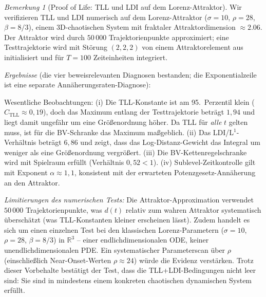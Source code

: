 \documentclass[12pt,a4paper]{article}
\theoremstyle{definition}
\theoremstyle{plain}
\theoremstyle{remark}
\newtheorem{remark}[definition]{Bemerkung}
\begin{document}
\begin{remark}[Proof of Life: TLL und LDI auf dem Lorenz-Attraktor]
\label{rem:tll-ldi-lorenz}
Wir verifizieren TLL und LDI numerisch auf dem Lorenz-Attraktor ($\sigma = 10$, $\rho = 28$, $\beta = 8/3$), einem 3D-chaotischen System mit fraktaler Attraktordimension $\approx 2.06$. Der Attraktor wird durch $50\,000$ Trajektorienpunkte approximiert; eine Testtrajektorie wird mit Störung $(2, 2, 2)$ von einem Attraktorelement aus initialisiert und für $T = 100$ Zeiteinheiten integriert.

\emph{Ergebnisse} (die vier beweisrelevanten Diagnosen bestanden; die
Exponentialzeile ist eine separate Annäherungsraten-Diagnose):

\begin{center}
\small
{}
\end{center}

Wesentliche Beobachtungen: (i) Die TLL-Konstante ist am 95.\ Perzentil klein ($C_{\mathrm{TLL}} \approx 0{,}19$), doch das Maximum entlang der Testtrajektorie beträgt $1{,}94$ und liegt damit ungefähr um eine Größenordnung höher. Da TLL für \emph{alle} $t$ gelten muss, ist für die BV-Schranke das Maximum maßgeblich. (ii) Das LDI/L$^1$-Verhältnis beträgt $6{,}86$ und zeigt, dass das Log-Distanz-Gewicht das Integral um weniger als eine Größenordnung vergrößert. (iii) Die BV-Kettenregelschranke wird mit Spielraum erfüllt (Verhältnis $0{,}52 < 1$). (iv) Sublevel-Zeitkontrolle gilt mit Exponent $\alpha \approx 1{,}1$, konsistent mit der erwarteten Potenzgesetz-Annäherung an den Attraktor.

\emph{Limitierungen des numerischen Tests:}
Die Attraktor-Approximation verwendet $50\,000$ Trajektorienpunkte,
was $d(t)$ relativ zum wahren Attraktor systematisch überschätzt
(was TLL-Konstanten kleiner erscheinen lässt). Zudem handelt es
sich um einen einzelnen Test bei den klassischen Lorenz-Parametern
($\sigma=10$, $\rho=28$, $\beta=8/3$) in $\mathbb{R}^3$ -- einer
endlichdimensionalen ODE, keiner unendlichdimensionalen PDE.
Ein systematischer Parameterscan über $\rho$ (einschließlich
Near-Onset-Werten $\rho \approx 24$) würde die Evidenz
verstärken. Trotz dieser Vorbehalte bestätigt der Test, dass die
TLL+LDI-Bedingungen nicht leer sind: Sie sind in mindestens einem
konkreten chaotischen dynamischen System erfüllt.
\end{remark}
\end{document}
